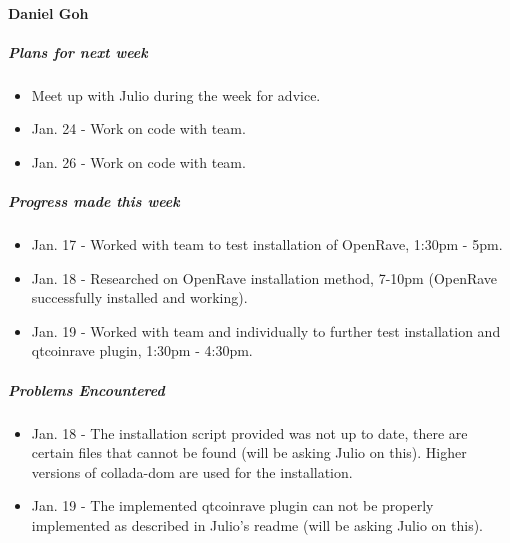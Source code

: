 {\vspace{3mm}
\paragraph{Daniel Goh}
\subparagraph{Plans for next week}
\begin{itemize}
  \item Meet up with Julio during the week for advice.
  \item Jan. 24 - Work on code with team.
  \item Jan. 26 - Work on code with team.
\end{itemize}

\subparagraph{Progress made this week}
\begin{itemize}
  \item Jan. 17 - Worked with team to test installation of OpenRave, 1:30pm - 5pm.
  \item Jan. 18 - Researched on OpenRave installation method, 7-10pm (OpenRave successfully installed and working).
  \item Jan. 19 - Worked with team and individually to further test installation and qtcoinrave plugin, 1:30pm - 4:30pm.
\end{itemize}

\subparagraph{Problems Encountered}
\begin{itemize}
  \item Jan. 18 - The installation script provided was not up to date, there are certain files that cannot be found (will be asking Julio on this). Higher versions of collada-dom are used for the installation.
  \item Jan. 19 - The implemented qtcoinrave plugin can not be properly implemented as described in Julio's readme (will be asking Julio on this).
\end{itemize}

}

\newpage

